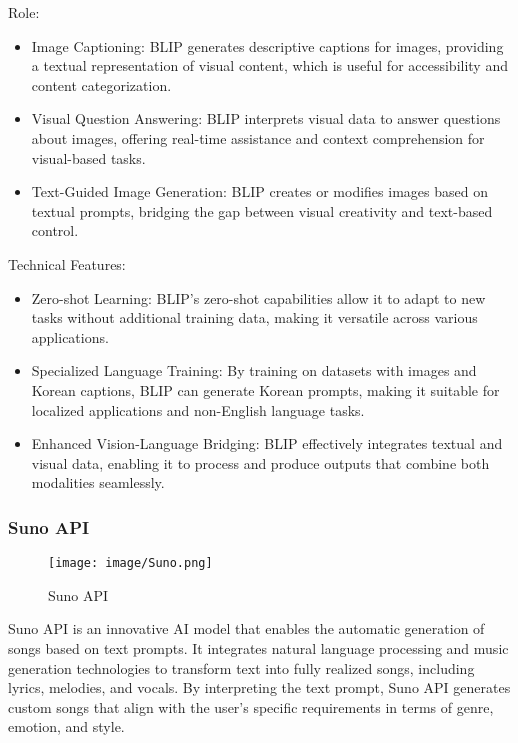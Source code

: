 \documentclass[conference]{IEEEtran}
\begin{document}
Role: 
\begin{itemize}
    \item Image Captioning: BLIP generates descriptive captions for images, providing a textual representation of visual content, which is useful for accessibility and content categorization.\\
    \item Visual Question Answering: BLIP interprets visual data to answer questions about images, offering real-time assistance and context comprehension for visual-based tasks.\\
    \item Text-Guided Image Generation: BLIP creates or modifies images based on textual prompts, bridging the gap between visual creativity and text-based control.\\
\end{itemize}

Technical Features:
\begin{itemize}
    \item Zero-shot Learning: BLIP’s zero-shot capabilities allow it to adapt to new tasks without additional training data, making it versatile across various applications.\\
    \item Specialized Language Training: By training on datasets with images and Korean captions, BLIP can generate Korean prompts, making it suitable for localized applications and non-English language tasks.\\
    \item Enhanced Vision-Language Bridging: BLIP effectively integrates textual and visual data, enabling it to process and produce outputs that combine both modalities seamlessly.\\
\end{itemize}

\subsubsection{Suno API}

\begin{figure}[h!]
    \centering
    \texttt{[image: image/Suno.png]}
    \caption{Suno API}
    \label{fig:enter-label}
\end{figure}

\noindent Suno API is an innovative AI model that enables the automatic generation of songs based on text prompts. It integrates natural language processing and music generation technologies to transform text into fully realized songs, including lyrics, melodies, and vocals. By interpreting the text prompt, Suno API generates custom songs that align with the user’s specific requirements in terms of genre, emotion, and style.\\
\end{document}

